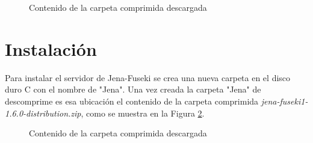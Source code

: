 \begin{figure}[!ht]
	\centering
    \caption{Contenido de la carpeta comprimida descargada}
    \label{ventana-contenido-apache-jena-fiseki}
\end{figure}

\section{Instalación}

Para instalar el servidor de Jena-Fuseki se crea una nueva carpeta en el disco duro C con el nombre de "Jena". Una vez creada la carpeta "Jena" de descomprime es esa ubicación el contenido de la carpeta comprimida \textit{jena-fuseki1-1.6.0-distribution.zip}, como se muestra en la Figura \ref{contenido-carpeta-apache-jena-fiseki}.

\begin{figure}[!ht]
	\centering
    \caption{Contenido de la carpeta comprimida descargada}
    \label{contenido-carpeta-apache-jena-fiseki}
\end{figure}

